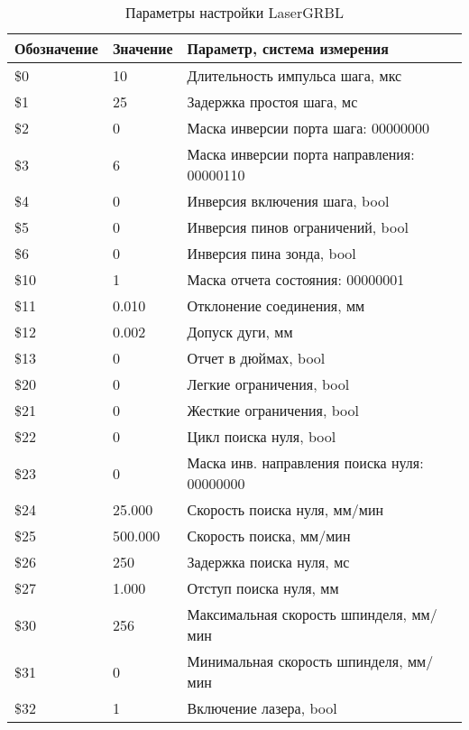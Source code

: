 \begin{table}[h!]
    \caption{Параметры настройки LaserGRBL}
    \centering
    \begin{tabular}{|l|l|l|}
        \hline
        Обозначение & Значение & Параметр, система измерения \\
        \hline
        \$0 & 10 & Длительность импульса шага, мкс \\
        \hline
        \$1 & 25 & Задержка простоя шага, мс \\
        \hline
        \$2 & 0 & Маска инверсии порта шага: 00000000 \\
        \hline
        \$3 & 6 & Маска инверсии порта направления: 00000110 \\
        \hline
        \$4 & 0 & Инверсия включения шага, bool \\
        \hline
        \$5 & 0 & Инверсия пинов ограничений, bool \\
        \hline
        \$6 & 0 & Инверсия пина зонда, bool \\
        \hline
        \$10 & 1 & Маска отчета состояния: 00000001 \\
        \hline
        \$11 & 0.010 & Отклонение соединения, мм \\
        \hline
        \$12 & 0.002 & Допуск дуги, мм \\
        \hline
        \$13 & 0 & Отчет в дюймах, bool \\
        \hline
        \$20 & 0 & Легкие ограничения, bool \\
        \hline
        \$21 & 0 & Жесткие ограничения, bool \\
        \hline
        \$22 & 0 & Цикл поиска нуля, bool \\
        \hline
        \$23 & 0 & Маска инв. направления поиска нуля: 00000000 \\
        \hline
        \$24 & 25.000 & Скорость поиска нуля, мм/мин \\
        \hline
        \$25 & 500.000 & Скорость поиска, мм/мин \\
        \hline
        \$26 & 250 & Задержка поиска нуля, мс \\
        \hline
        \$27 & 1.000 & Отступ поиска нуля, мм \\
        \hline
        \$30 & 256 & Максимальная скорость шпинделя, мм/мин \\
        \hline
        \$31 & 0 & Минимальная скорость шпинделя, мм/мин \\
        \hline
        \$32 & 1 & Включение лазера, bool \\

\end{tabular}
\end{table}
